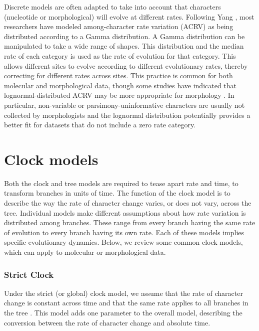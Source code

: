Discrete models are often adapted to take into account that characters (nucleotide or morphological) will evolve at different rates. Following Yang \citep{Yang1994a}, 
most researchers have modeled among-character rate variation (ACRV) as being distributed according to a Gamma distribution.
A Gamma distribution can be manipulated to take a wide range of shapes.
This distribution 
and the median rate of each category is used as the rate of evolution for that category.
This allows different sites to evolve according to different evolutionary rates, thereby correcting for different rates across sites.
This practice is common for both molecular and morphological data, though some studies have indicated that lognormal-distributed ACRV may be more appropriate for morphology \citep{wagner2011, Harrison2015}.
In particular, non-variable or parsimony-uninformative characters are usually not collected by morphologists and the lognormal distribution potentially provides a better fit for datasets that do not include a zero rate category.
 \citep{Lewis2001,leache2015}

\section{Clock models}
Both the clock and tree models are required to tease apart rate and time,  to transform branches in units of time.
The function of the clock model is to describe the way the rate of character change varies, or does not vary, across the tree.
Individual models make different assumptions about how rate variation is distributed among branches.
These range from  every branch having the same rate of evolution to every branch having its own rate.
Each of these models implies specific evolutionary dynamics.
Below, we review some common clock models, which can apply to molecular or morphological data.

\subsubsection{Strict Clock}
Under the strict (or global) clock model, we assume that the rate of character change is constant across time and that the same rate applies to all branches in the tree \citep{Zuckerkandl1962, Zuckerkandl1965EvolutionaryDivergenceConvergence}.
This model adds one parameter to the overall model, describing the conversion between the rate of character change  and absolute time.


